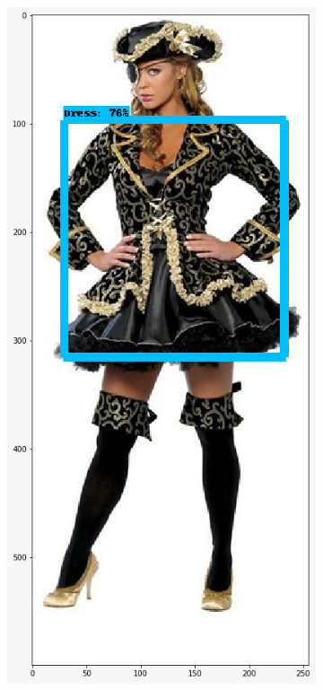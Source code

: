 \documentclass[10pt, a4paper]{article}
\begin{document}
\begin{multicols}{2}
    	\begin{figure}[H]
          \begin{subfigure}[b]{0.3\columnwidth}
            \includegraphics[width=\linewidth]{img/object_detection_img.jpg}

\end{subfigure}
\end{figure}
\end{multicols}
\end{document}
